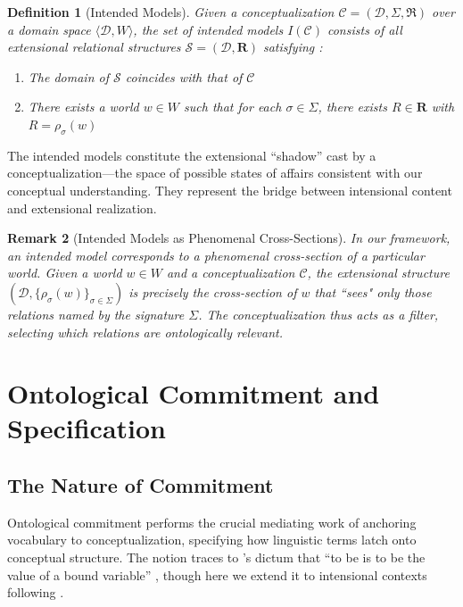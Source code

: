 \documentclass[12pt,a4paper]{article}
\newtheorem{definition}{Definition}[section]
\newtheorem{remark}[definition]{Remark}
\newcommand{\domain}{\mathcal{D}}
\newcommand{\concept}{\mathcal{C}}
\newcommand{\intrel}{\mathfrak{R}}
\begin{document}
\begin{definition}[Intended Models]
Given a conceptualization $\concept = (\domain, \Sigma, \intrel)$ over a domain space $\langle \domain, W \rangle$, the set of \emph{intended models} $I(\concept)$ consists of all extensional relational structures $\mathcal{S} = (\domain, \mathbf{R})$ satisfying \citep[following][]{guarino2009}:
\begin{enumerate}
    \item The domain of $\mathcal{S}$ coincides with that of $\concept$
    \item There exists a world $w \in W$ such that for each $\sigma \in \Sigma$, there exists $R \in \mathbf{R}$ with $R = \rho_\sigma(w)$
\end{enumerate}
\end{definition}

The intended models constitute the extensional ``shadow'' cast by a conceptualization---the space of possible states of affairs consistent with our conceptual understanding. They represent the bridge between intensional content and extensional realization.

\begin{remark}[Intended Models as Phenomenal Cross-Sections]
In our framework, an intended model corresponds to a phenomenal cross-section of a particular world. Given a world $w \in W$ and a conceptualization $\concept$, the extensional structure $(\domain, \{\rho_\sigma(w)\}_{\sigma \in \Sigma})$ is precisely the cross-section of $w$ that ``sees" only those relations named by the signature $\Sigma$. The conceptualization thus acts as a \emph{filter}, selecting which relations are ontologically relevant.
\end{remark}

\section{Ontological Commitment and Specification}

\subsection{The Nature of Commitment}

Ontological commitment performs the crucial mediating work of anchoring vocabulary to conceptualization, specifying how linguistic terms latch onto conceptual structure. The notion traces to \citeauthor{quine1948}'s dictum that ``to be is to be the value of a bound variable'' \citep{quine1948}, though here we extend it to intensional contexts following \citet{guarino1998}.
\end{document}
